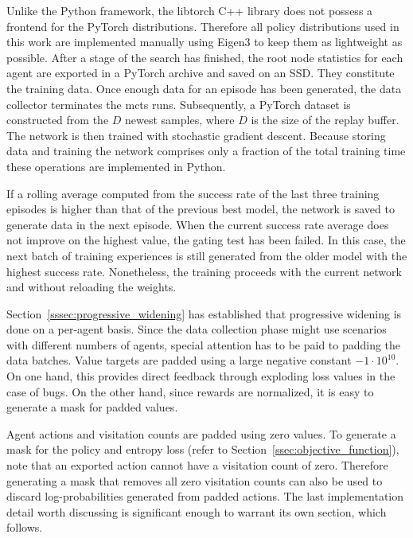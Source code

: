 Unlike the Python framework, the libtorch C++ library does not possess a frontend for the PyTorch distributions. Therefore all policy distributions used in this work are implemented manually using Eigen3 \cite{guennebaudEigenV32010} to keep them as lightweight as possible.  After a stage of the search has finished, the root node statistics for each agent are exported in a PyTorch archive and saved on an SSD. They constitute the training data. Once enough data for an episode has been generated, the data collector terminates the \gls{mcts} runs. Subsequently, a PyTorch dataset is constructed from the $D$ newest samples, where $D$ is the size of the replay buffer. The network is then trained with stochastic gradient descent. Because storing data and training the network comprises only a fraction of the total training time these operations are implemented in Python.

If a rolling average computed from the success rate of the last three training episodes is higher than that of the previous best model, the network is saved to generate data in the next episode. When the current success rate average does not improve on the highest value, the gating test has been failed. In this case, the next batch of training experiences is still generated from the older model with the highest success rate. Nonetheless, the training proceeds with the current network and without reloading the weights.

Section~\ref{sssec:progressive_widening} has established that progressive widening is done on a per-agent basis. Since the data collection phase might use scenarios with different numbers of agents, special attention has to be paid to padding the data batches. Value targets are padded using a large negative constant $-1 \cdot 10^{10}$. On one hand, this provides direct feedback through exploding loss values in the case of bugs. On the other hand, since rewards are normalized, it is easy to generate a mask for padded values.

Agent actions and visitation counts are padded using zero values. To generate a mask for the policy and entropy loss (refer to Section~\ref{ssec:objective_function}), note that an exported action cannot have a visitation count of zero. Therefore generating a mask that removes all zero visitation counts can also be used to discard log-probabilities generated from padded actions. The last implementation detail worth discussing is significant enough to warrant its own section, which follows.

